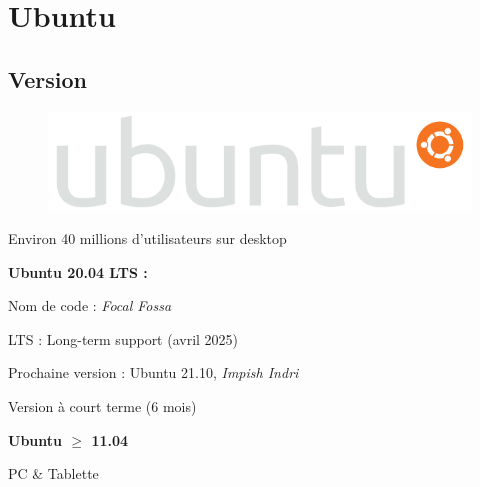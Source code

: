\documentclass{beamer}
\begin{document}
\section{Ubuntu}
\subsection*{Version}
\begin{frame}

\begin{figure}
\includegraphics[width=0.55\linewidth]{images/Ubuntu_logo}
\end{figure}

Environ 40 millions d'utilisateurs sur desktop

\begin{block}{\bf Ubuntu 20.04 LTS :}

Nom de code : \textit{Focal Fossa}

LTS : Long-term support (avril 2025)


\end{block}


\begin{exampleblock}{Prochaine version :}
 Ubuntu 21.10, \textit{Impish Indri}
 
 Version à court terme (6 mois)
\end{exampleblock}

\end{frame}

\begin{frame}

  \begin{center}
    {\bf Ubuntu $\geq$ 11.04 }
  \end{center}

  \begin{center}
    PC \& Tablette
  \end{center}

\end{frame}
\end{document}
